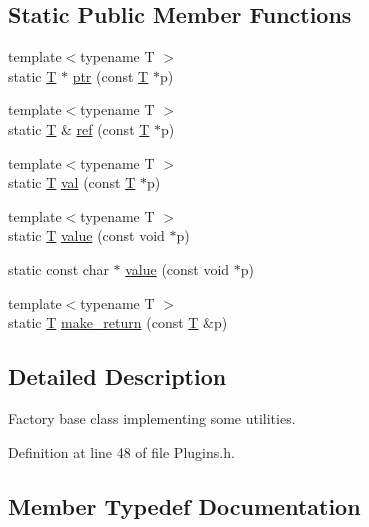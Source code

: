 \subsection*{Static Public Member Functions}
\begin{DoxyCompactItemize}
\item 
{\footnotesize template$<$typename T $>$ }\\static \hyperlink{class_t}{T} $\ast$ \hyperlink{struct_d_d4hep_1_1_plugin_factory_base_ab5cd0de7d88623c7dbf31330627ced59}{ptr} (const \hyperlink{class_t}{T} $\ast$p)
\item 
{\footnotesize template$<$typename T $>$ }\\static \hyperlink{class_t}{T} \& \hyperlink{struct_d_d4hep_1_1_plugin_factory_base_af5e80d94fc2bd6eaa33e8a7437c78db5}{ref} (const \hyperlink{class_t}{T} $\ast$p)
\item 
{\footnotesize template$<$typename T $>$ }\\static \hyperlink{class_t}{T} \hyperlink{struct_d_d4hep_1_1_plugin_factory_base_afd305aea9194b03ea56cd99a61f491d1}{val} (const \hyperlink{class_t}{T} $\ast$p)
\item 
{\footnotesize template$<$typename T $>$ }\\static \hyperlink{class_t}{T} \hyperlink{struct_d_d4hep_1_1_plugin_factory_base_a7fc28aeb61b438dd2e9adcc9a6fc09b5}{value} (const void $\ast$p)
\item 
static const char $\ast$ \hyperlink{struct_d_d4hep_1_1_plugin_factory_base_a8adc43989827d1bc0a6d079b3e64f756}{value} (const void $\ast$p)
\item 
{\footnotesize template$<$typename T $>$ }\\static \hyperlink{class_t}{T} \hyperlink{struct_d_d4hep_1_1_plugin_factory_base_aba8cd2aea2aac182a69fdb751d5f20d6}{make\+\_\+return} (const \hyperlink{class_t}{T} \&p)
\end{DoxyCompactItemize}


\subsection{Detailed Description}
Factory base class implementing some utilities. 

Definition at line 48 of file Plugins.\+h.



\subsection{Member Typedef Documentation}
\hypertarget{struct_d_d4hep_1_1_plugin_factory_base_a61b840cc18cdd24ae2e383da306b9c9a}{}\label{struct_d_d4hep_1_1_plugin_factory_base_a61b840cc18cdd24ae2e383da306b9c9a} 
